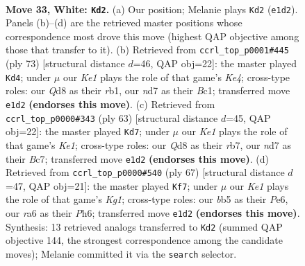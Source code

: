 \documentclass[11pt]{article}
\begin{document}
\clearpage

\begin{figure}[p]\centering
\begin{subfigure}{0.46\textwidth}\centering
\resizebox{\linewidth}{!}{%
\newchessgame
\chessboard[
  setfen={3Q4/3n2k1/r7/pb1Pp3/8/6p1/PPP3P1/2R1K3 w - - 2 33},
  showmover=false,
  pgfstyle=straightmove, color=movearrow, markmove={e1-d2}
]}
\caption{}
\end{subfigure}\hfill
\begin{subfigure}{0.46\textwidth}\centering
\resizebox{\linewidth}{!}{%
\newchessgame
\chessboard[
  setfen={8/5p2/1p5p/2r1k3/1p5P/3B4/PP3P2/1Rb1K3 b - - 8 37},
  showmover=false,
  pgfstyle=straightmove, color=movearrow, markmove={e5-d4}
]}
\caption{}
\end{subfigure}
\\[4pt]
\begin{subfigure}{0.46\textwidth}\centering
\resizebox{\linewidth}{!}{%
\newchessgame
\chessboard[
  setfen={2r1k3/1Rb5/p2p2p1/3P1pP1/7p/8/P2BK2P/8 b - - 11 32},
  showmover=false,
  pgfstyle=straightmove, color=movearrow, markmove={e8-d7}
]}
\caption{}
\end{subfigure}\hfill
\begin{subfigure}{0.46\textwidth}\centering
\resizebox{\linewidth}{!}{%
\newchessgame
\chessboard[
  setfen={r5k1/8/4pp1p/3n3P/pP1R4/5PB1/P1K5/8 b - - 0 34},
  showmover=false,
  pgfstyle=straightmove, color=movearrow, markmove={g8-f7}
]}
\caption{}
\end{subfigure}
\caption{\textbf{Move 33, White: \texttt{Kd2}.} (a) Our position; Melanie plays \texttt{Kd2} (\texttt{e1d2}). Panels (b)--(d) are the retrieved master positions whose correspondence most drove this move (highest QAP objective among those that transfer to it). (b) Retrieved from \texttt{ccrl\_top\_p0001\#445} (ply 73) [structural distance $d$=46, QAP obj=22]: the master played \texttt{Kd4}; under $\mu$ our \emph{Ke1} plays the role of that game's \emph{Ke4}; cross-type roles: our \emph{Q}d8 as their \emph{r}b1, our \emph{n}d7 as their \emph{B}c1; transferred move \texttt{e1d2} \textbf{(endorses this move)}. (c) Retrieved from \texttt{ccrl\_top\_p0000\#343} (ply 63) [structural distance $d$=45, QAP obj=22]: the master played \texttt{Kd7}; under $\mu$ our \emph{Ke1} plays the role of that game's \emph{Ke1}; cross-type roles: our \emph{Q}d8 as their \emph{r}b7, our \emph{n}d7 as their \emph{B}c7; transferred move \texttt{e1d2} \textbf{(endorses this move)}. (d) Retrieved from \texttt{ccrl\_top\_p0000\#540} (ply 67) [structural distance $d$=47, QAP obj=21]: the master played \texttt{Kf7}; under $\mu$ our \emph{Ke1} plays the role of that game's \emph{Kg1}; cross-type roles: our \emph{b}b5 as their \emph{P}e6, our \emph{r}a6 as their \emph{P}h6; transferred move \texttt{e1d2} \textbf{(endorses this move)}. Synthesis: 13 retrieved analogs transferred to \texttt{Kd2} (summed QAP objective 144, the strongest correspondence among the candidate moves); Melanie committed it via the \texttt{search} selector.}
\label{fig:thought-m64}
\end{figure}
\end{document}

